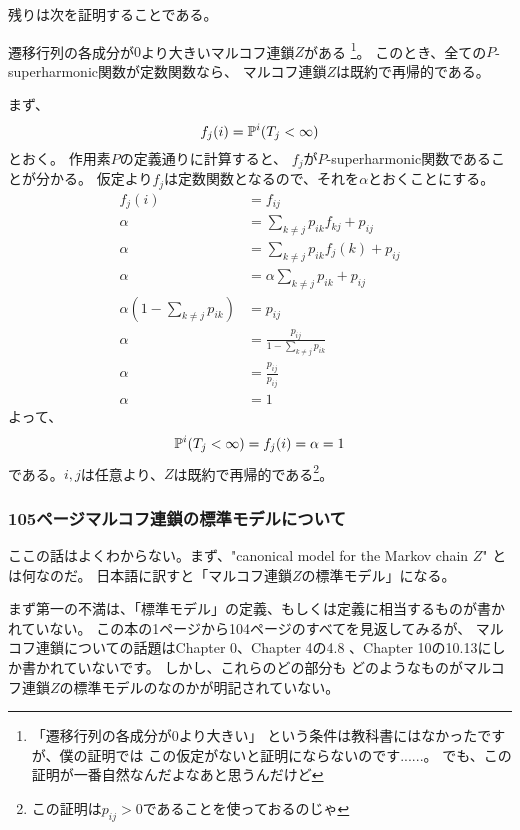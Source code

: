         残りは次を証明することである。
        \begin{center}
          遷移行列の各成分が$0$より大きいマルコフ連鎖$Z$がある
          \footnote{「遷移行列の各成分が$0$より大きい」
          という条件は教科書にはなかったですが、僕の証明では
          この仮定がないと証明にならないのです......。
          でも、この証明が一番自然なんだよなあと思うんだけど}。
          このとき、全ての$P$-superharmonic関数が定数関数なら、
          マルコフ連鎖$Z$は既約で再帰的である。
        \end{center}

        まず、
        \[
          f_j(i) = {\mathbb{P}}^i(T_j < \infty)
        \]
        とおく。
        作用素$P$の定義通りに計算すると、
        $f_j$が$P$-superharmonic関数であることが分かる。
        仮定より$f_j$は定数関数となるので、それを$\alpha$とおくことにする。
        \begin{align*}
          f_j(i) &= f_{ij}\\
          \alpha &= \sum_{k \neq j} p_{ik}f_{kj} + p_{ij}\\
          \alpha &= \sum_{k \neq j} p_{ik}f_j(k) + p_{ij}\\
          \alpha &= \alpha\sum_{k \neq j} p_{ik} + p_{ij}\\
          \alpha \left(1 - \sum_{k \neq j} p_{ik} \right) &= p_{ij}\\
          \alpha &= \frac{p_{ij}}{1 - \sum_{k \neq j} p_{ik}}\\
          \alpha &= \frac{p_{ij}}{p_{ij}}\\
          \alpha &= 1
        \end{align*}
        よって、
        \[
          {\mathbb{P}}^i(T_j < \infty) =f_{j}(i) = \alpha = 1
        \]
        である。$i,j$は任意より、$Z$は既約で再帰的である\footnote{この証明は$p_{ij} > 0$であることを使っておるのじゃ}。

      \subsubsection{105ページマルコフ連鎖の標準モデルについて}
        ここの話はよくわからない。まず、"canonical model for the Markov chain $Z$"
        とは何なのだ。
        日本語に訳すと「マルコフ連鎖$Z$の標準モデル」になる。

        まず第一の不満は、「標準モデル」の定義、もしくは定義に相当するものが書かれていない。
        この本の1ページから104ページのすべてを見返してみるが、
        マルコフ連鎖についての話題はChapter 0、Chapter 4の4.8
        、Chapter 10の10.13にしか書かれていないです。
        しかし、これらのどの部分も
        どのようなものがマルコフ連鎖$Z$の標準モデルのなのかが明記されていない。

